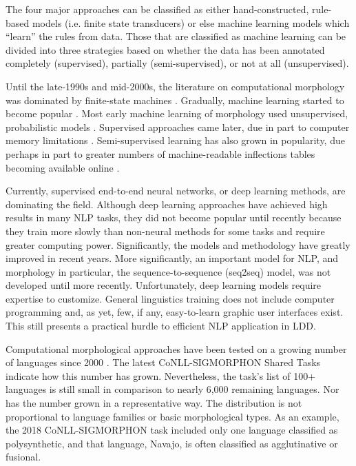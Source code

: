 \documentclass[12pt]{article}
\begin{document}
The four major approaches can be classified as either hand-constructed, rule-based models (i.e. finite state transducers) or else machine learning models which ``learn'' the rules from data. Those that are classified as machine learning can be divided into three strategies based on whether the data has been annotated completely (supervised), partially (semi-supervised), or not at all (unsupervised). 

Until the late-1990s and mid-2000s, the literature on computational morphology was dominated by finite-state machines \cite{kaplan_phonological_1981,koskenniemi_two-level_1983,beesley_finite-state_2003}. Gradually, machine learning started to become popular \cite{cohen_joint_2007,ruokolainen_comparative_2016}. Most early machine learning of morphology used unsupervised, probabilistic models \cite{roark_computational_2007}. Supervised approaches came later, due in part to computer memory limitations \cite{hammarstrom_unsupervised_2011}. Semi-supervised learning has also grown in popularity, due perhaps in part to greater numbers of machine-readable inflections tables becoming available online \cite{soricut_unsupervised_2015,schone_knowledge-free_2001,goldsmith_computational_2017}. 

Currently, supervised end-to-end neural networks, or deep learning methods, are dominating the field. Although deep learning approaches have achieved high results in many NLP tasks, they did not become popular until recently because they train more slowly than non-neural methods for some tasks \cite{cotterell_cross-lingual_2017} and require greater computing power. Significantly,  the models and methodology have greatly improved in recent years. More significantly, an important model for NLP, and morphology in particular, the sequence-to-sequence (seq2seq) model, was not developed until more recently. Unfortunately, deep learning models require expertise to customize. General linguistics training does not include computer programming and, as yet, few, if any, easy-to-learn graphic user interfaces exist. This still presents a practical hurdle to efficient NLP application in LDD.  

Computational morphological approaches have been tested on a growing number of languages since 2000 \cite{hammarstrom_unsupervised_2011}. The latest CoNLL-SIGMORPHON Shared Tasks \cite{cotterell_cross-lingual_2017,cotterell_conllsigmorphon_2018} indicate how this number has grown. Nevertheless, the task's list of 100+ languages is still small in comparison to nearly 6,000 remaining languages. Nor has the number grown in a representative way. The distribution is not proportional to language families or basic morphological types. As an example, the 2018 CoNLL-SIGMORPHON task included only one language classified as polysynthetic, and that language, Navajo, is often classified as agglutinative or fusional.
\end{document}
